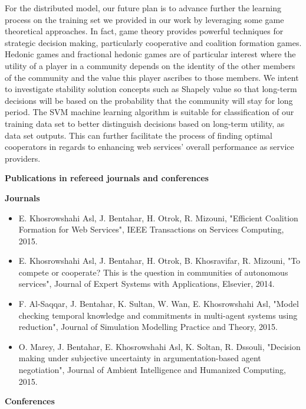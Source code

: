 For the distributed model, our future plan is to advance further the learning process on the training set we provided in our work by leveraging some game theoretical approaches. In fact, game theory provides powerful techniques for strategic decision making, particularly cooperative and coalition formation games. Hedonic games and fractional hedonic games are of particular interest where the utility of a player in a community depends on the identity of the other members of the community and the value this player ascribes to those members. We intent to investigate stability solution concepts such as Shapely value so that long-term decisions will be based on the probability that the community will stay for long period. The SVM machine learning algorithm is suitable for classification of our training data set to better distinguish  decisions based on long-term utility, as data set outputs. This can further facilitate the process of finding optimal cooperators in regards to enhancing web services' overall performance as service providers.

\newpage
\textbf{Publications in refereed journals and conferences}

\textbf{Journals}

\begin{itemize}
\item E. Khosrowshahi Asl, J. Bentahar, H. Otrok, R. Mizouni, "Efficient Coalition Formation for Web Services", IEEE Transactions on Services Computing, 2015.

\item E. Khosrowshahi Asl, J. Bentahar, H. Otrok, B. Khosravifar, R. Mizouni, "To compete or cooperate? This is the question in communities of autonomous services", Journal of Expert Systems with Applications, Elsevier, 2014.

\item F. Al-Saqqar, J. Bentahar, K. Sultan, W. Wan, E. Khosrowshahi Asl, "Model checking temporal knowledge and commitments in multi-agent systems using reduction", Journal of Simulation Modelling Practice and Theory, 2015.
    
\item O. Marey, J. Bentahar, E. Khosrowshahi Asl, K. Soltan, R. Dssouli, "Decision making under subjective uncertainty in argumentation-based agent negotiation", Journal of Ambient Intelligence and Humanized Computing, 2015.

\end{itemize}

\textbf{Conferences}

